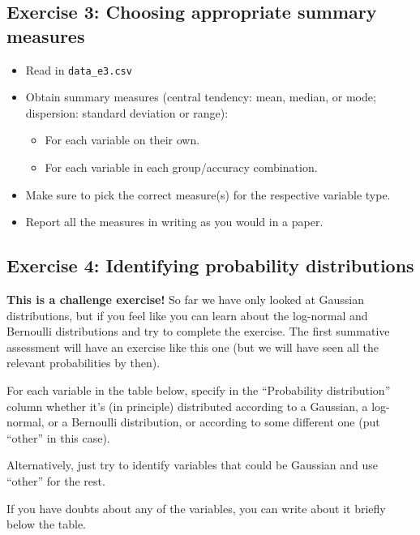 \documentclass[
]{article}
\providecommand{\tightlist}{%
  \setlength{\itemsep}{0pt}\setlength{\parskip}{0pt}}
\begin{document}
\newpage

\subsection{Exercise 3: Choosing appropriate summary
measures}\label{exercise-3-choosing-appropriate-summary-measures}

\begin{itemize}
\tightlist
\item
  Read in \texttt{data\_e3.csv}
\item
  Obtain summary measures (central tendency: mean, median, or mode;
  dispersion: standard deviation or range):

  \begin{itemize}
  \tightlist
  \item
    For each variable on their own.
  \item
    For each variable in each group/accuracy combination.
  \end{itemize}
\item
  Make sure to pick the correct measure(s) for the respective variable
  type.
\item
  Report all the measures in writing as you would in a paper.
\end{itemize}

\newpage

\subsection{Exercise 4: Identifying probability
distributions}\label{exercise-4-identifying-probability-distributions}

\textbf{This is a challenge exercise!} So far we have only looked at
Gaussian distributions, but if you feel like you can learn about the
log-normal and Bernoulli distributions and try to complete the exercise.
The first summative assessment will have an exercise like this one (but
we will have seen all the relevant probabilities by then).

For each variable in the table below, specify in the ``Probability
distribution'' column whether it's (in principle) distributed according
to a Gaussian, a log-normal, or a Bernoulli distribution, or according
to some different one (put ``other'' in this case).

Alternatively, just try to identify variables that could be Gaussian and
use ``other'' for the rest.

If you have doubts about any of the variables, you can write about it
briefly below the table.
\end{document}
